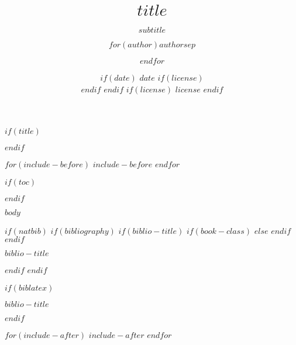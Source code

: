 \documentclass[$if(fontsize)$$fontsize$,$endif$$if(lang)$$babel-lang$,$endif$$if(handout)$handout,$endif$$if(colorlinks)$dvipsnames,$endif$$if(beamer)$ignorenonframetext,$endif$$for(classoption)$$classoption$$sep$,$endfor$]{$documentclass$}
\title[$shorttitle$]{$title$}
\subtitle{$subtitle$}
\author[
    $if(short-author)$
    $for(short-author)$$short-author$$sep$ \and $endfor$
  $else$
    $for(author)$$author$$sep$ \and $endfor$
  $endif$
  ]{$for(author)$$author$$sep$ \and $endfor$}
\institute[
  $if(short-institute)$
    $for(short-institute)$$short-institute$$sep$ \and $endfor$
  $endif$
  ]{
  $if(department)$
    $for(department)$$department$$sep$ \and $endfor$ \\
  $endif$
  $for(institute)$$institute$$sep$ \and $endfor$
  $if(email)$
    \\ $for(email)$ \href{mailto:$email$}{\nolinkurl{$email$}}$sep$ \and $endfor$
  $endif$
  }
\date[
  $if(short-date)$
    $short-date$
  $else$
    $date$
  $endif$]{
  $if(date)$
    $date$
    $if(license)$
      \\ \vspace{5mm}
    $endif$
  $endif$
  $if(license)$
    {\scriptsize $license$}
  $endif$
}
\newif\ifbibliography
\begin{document}
$if(title)$
  \begin{frame}[plain]
  \titlepage
  \end{frame}
$endif$

$for(include-before)$
  $include-before$
$endfor$

$if(toc)$
  \begin{frame}
  \tableofcontents[hideallsubsections]
  \end{frame}
$endif$

$body$

$if(natbib)$
  $if(bibliography)$
    $if(biblio-title)$
      $if(book-class)$
        \renewcommand\bibname{$biblio-title$}
        $else$
        \renewcommand\refname{$biblio-title$}
      $endif$
    $endif$
    \begin{frame}[allowframebreaks]{$biblio-title$}
    \bibliographytrue
    
    \end{frame}
  $endif$
$endif$

$if(biblatex)$
  \begin{frame}[allowframebreaks]{$biblio-title$}
  \bibliographytrue
  \printbibliography[heading=none]
  \end{frame}
$endif$

$for(include-after)$
  $include-after$
$endfor$
\end{document}
